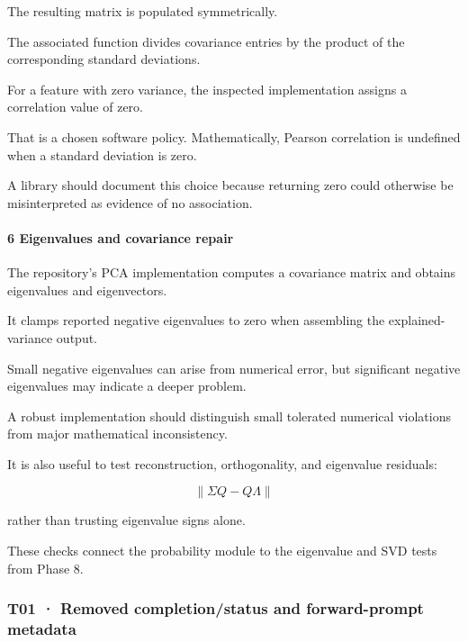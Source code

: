 The resulting matrix is populated symmetrically.

The associated  function divides covariance entries by the product of the corresponding standard deviations.

For a feature with zero variance, the inspected implementation assigns a correlation value of zero.

That is a chosen software policy. Mathematically, Pearson correlation is undefined when a standard deviation is zero.

A library should document this choice because returning zero could otherwise be misinterpreted as evidence of no association.

\paragraph{6 Eigenvalues and covariance repair}\label{02-foundations-ii-ch039-eigenvalues-and-covariance-repair}

\hypertarget{02-foundations-ii-ch039-eigenvalues-and-covariance-repair}{}

The repository's PCA implementation computes a covariance matrix and obtains eigenvalues and eigenvectors.

It clamps reported negative eigenvalues to zero when assembling the explained-variance output.

Small negative eigenvalues can arise from numerical error, but significant negative eigenvalues may indicate a deeper problem.

A robust implementation should distinguish small tolerated numerical violations from major mathematical inconsistency.

It is also useful to test reconstruction, orthogonality, and eigenvalue residuals:

\[
 \|\Sigma Q-Q\Lambda\|
\]

rather than trusting eigenvalue signs alone.

These checks connect the probability module to the eigenvalue and SVD tests from Phase 8.

\subsubsection{T01 · Removed completion/status and forward-prompt metadata}\label{02-foundations-ii-ch039-t01-removed-completionstatus-and-forward-prompt-metadata}

